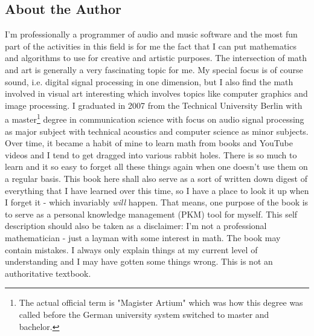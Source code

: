 

\subsection{About the Author}
I'm professionally a programmer of audio and music software and the most fun part of the activities in this field is for me the fact that I can put mathematics and algorithms to use for creative and artistic purposes. The intersection of math and art is generally a very fascinating topic for me. My special focus is of course sound, i.e. digital signal processing in one dimension, but I also find the math involved in visual art interesting which involves topics like computer graphics and image processing. I graduated in 2007 from the Technical University Berlin with a master\footnote{The actual official term is "Magister Artium" which was how this degree was called before the German university system switched to master and bachelor.} degree in communication science with focus on audio signal processing as major subject with technical acoustics and computer science as minor subjects. Over time, it became a habit of mine to learn math from books and YouTube videos and I tend to get dragged into various rabbit holes. There is so much to learn and it so easy to forget all these things again when one doesn't use them on a regular basis. This book here shall also serve as a sort of written down digest of everything that I have learned over this time, so I have a place to look it up when I forget it - which invariably \emph{will} happen. That means, one purpose of the book is to serve as a personal knowledge management (PKM) tool for myself. This self description should also be taken as a disclaimer: I'm not a professional mathematician - just a layman with some interest in math. The book may contain mistakes. I always only explain things at my current level of understanding and I may have gotten some things wrong. This is not an authoritative textbook.



